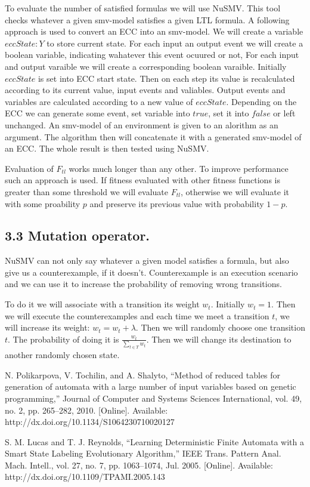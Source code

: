 \documentclass[fleqn,twocolumn]{article}
\begin{document}
To evaluate the number of satisfied formulas we will use NuSMV. This tool checks whatever a given smv-model satisfies a given LTL formula. A following approach is used
to convert an ECC into an smv-model. We will create a variable $eccState : Y$ to store current state. For each input an output event we will create a boolean variable,
indicating wahatever this event ocuured or not, For each input and output varaible we will create a corresponding boolean varaible.
Initially $eccState$ is set into ECC start state. Then on each step its value is recalculated according to its current value, input events and valiables. Output events
and variables are calculated according to a new value of $eccState$. Depending on the ECC we can generate some event, set variable into $true$, set it into $false$ or
left unchanged.
An smv-model of an environment is given to an alorithm as an argument. The algorithm then will concatenate it with a generated smv-model of an ECC. The whole result
is then tested using NuSMV.

Evaluation of $F_{tl}$ works much longer than any other. To improve performance such an approach is used. If fitness evaluated with other fitness functions is
greater than some threshold we will evaluate $F_{tl}$, otherwise we will evaluate it with some proability $p$ and preserve its previous value with probability $1 - p$.

\subsection{3.3 Mutation operator.}

NuSMV can not only say whatever a given model satisfies a formula, but also give us a counterexample, if it doesn't. Counterexample is an execution scenario and we can
use it to increase the probability of removing wrong transitions.

To do it we will associate with a transition its weight $w_t$. Initially $w_t = 1$. Then we will execute the counterexamples and each time we meet a transition $t$, we
will increase its weight: $w_t = w_t + \lambda$. Then we will randomly choose one transition $t$. The probability of doing it is $\frac{w_t}{\sum_{t \in T}w_t}$.
Then we will change its destination to another randomly chosen state.

\begin{thebibliography}{2}

N. Polikarpova, V. Tochilin, and A. Shalyto, “Method of reduced tables for generation of automata with a large number of input variables
based on genetic programming,” Journal of Computer and Systems Sciences International, vol. 49, no. 2, pp. 265–282, 2010. [Online].
Available: http://dx.doi.org/10.1134/S1064230710020127

S. M. Lucas and T. J. Reynolds, “Learning Deterministic Finite Automata with a Smart State Labeling Evolutionary Algorithm,” IEEE
Trans. Pattern Anal. Mach. Intell., vol. 27, no. 7, pp. 1063–1074, Jul. 2005. [Online]. Available: http://dx.doi.org/10.1109/TPAMI.2005.143

\end{thebibliography}
\end{document}
